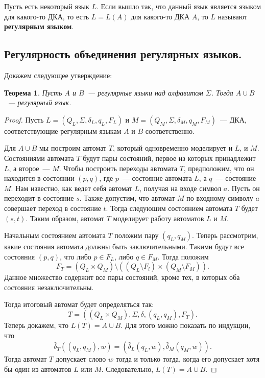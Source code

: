 \documentclass[a4paper,12pt]{article}
\newtheorem*{theorem}{Теорема}
\begin{document}
	 Пусть есть некоторый язык \(L\). Если вышло так, что данный язык является языком для какого-то ДКА, то есть \(L = L(A)\) для какого-то ДКА \(A\), то \(L\) называют \textbf{регулярным языком}.
	 
	 \subsection{Регулярность объединения регулярных языков.}
	 Докажем следующее утверждение:
	 \begin{theorem}
	 	Пусть \(A\) и \(B\)~--- регулярные языки над алфавитом \(\Sigma\). Тогда \(A \cup B\)~--- регулярный язык.
	 \end{theorem}
	 \begin{proof}
	 	Пусть \(L = (Q_L, \Sigma, \delta_L, q_L, F_L)\) и \(M = (Q_M, \Sigma, \delta_M, q_M, F_M)\)~--- ДКА, соответствующие регулярным языкам \(A\) и \(B\) соответственно.
	 	
	 	Для \(A \cup B\) мы построим автомат \(T\), который одновременно моделирует и \(L\), и \(M\). Состояниями автомата \(T\) будут пары состояний, первое из которых принадлежит \(L\), а второе~--- \(M\). Чтобы построить переходы автомата \(T\), предположим, что он находится в состоянии \((p, q)\), где \(p\)~--- состояние автомата \(L\), а \(q\)~--- состояние \(M\). Нам известно, как ведет себя автомат \(L\), получая на входе символ \(a\). Пусть он переходит в состояние \(s\). Также допустим, что автомат \(M\) по входному символу \(a\) совершает переход в состояние \(t\). Тогда следующим состоянием автомата \(T\) будет \((s, t)\). Таким образом, автомат \(T\) моделирует работу автоматов \(L\) и \(M\). 
	 	
	 	Начальным состоянием автомата \(T\) положим пару \((q_L, q_M)\). Теперь рассмотрим, какие состояния автомата должны быть заключительными. Такими будут все состояния \((p, q)\), что либо \(p \in F_L\), либо \(q \in F_M\). Тогда положим \[F_T = (Q_L \times Q_M) \setminus ((Q_L \setminus F_l) \times (Q_M \setminus F_M)).\]
	 	Данное множество содержит все пары состояний, кроме тех, в которых оба состояния незаключительны.
	 	
	 	Тогда итоговый автомат будет определяться так:
	 	\[T = ((Q_L \times Q_M), \Sigma, \delta, (q_L, q_M), F_T).\]
	 	Теперь докажем, что \(L(T) = A \cup B\). Для этого можно показать по индукции, что \[\hat{\delta}_T((q_L, q_M), w) = (\hat{\delta}_L(q_L, w), \hat{\delta}_M(q_M, w)).\]
	 	Тогда автомат \(T\) допускает слово \(w\) тогда и только тогда, когда его допускает хотя бы один из автоматов \(L\)  или \(M\). Следовательно, \(L(T) = A \cup B\).
	 \end{proof}
	 
\end{document}
